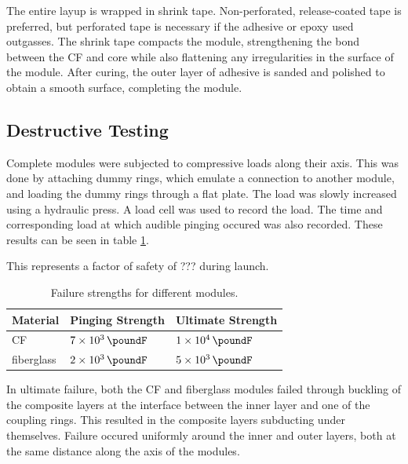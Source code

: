 \documentclass{aiaa-tc}%
\begin{document}
The entire layup is wrapped in shrink tape. Non-perforated, release-coated tape is preferred, but perforated tape is necessary if the adhesive or epoxy used outgasses.
The shrink tape compacts the module, strengthening the bond between the CF and core while also flattening any irregularities in the surface of the module. 
After curing, the outer layer of adhesive is sanded and polished to obtain a smooth surface, completing the module. 

\subsection{Destructive Testing}
Complete modules were subjected to compressive loads along their axis. This was done by attaching dummy rings, which emulate a connection to another module, and loading the dummy rings through a flat plate. 
The load was slowly increased using a hydraulic press. 
A load cell was used to record the load. The time and corresponding load at which audible pinging occured was also recorded.
These results can be seen in table \ref{tab:compression}.

This represents a factor of safety of ???
during launch.

\begin{table}
\caption{Failure strengths for different modules.}\label{tab:compression}
\begin{tabular}{lll}
	Material & Pinging Strength & Ultimate Strength\\
	\hline
	CF & $\SI{7e3}{\poundF}$ & $\SI{1e4}{\poundF}$ \\
	fiberglass & $\SI{2e3}{\poundF}$ & $\SI{5e3}{\poundF}$ \\
	
\end{tabular}
\end{table}

In ultimate failure, both the CF and fiberglass modules failed through buckling of the composite layers at the interface between the inner layer and one of the coupling rings.
This resulted in the composite layers subducting under themselves.
Failure occured uniformly around the inner and outer layers, both at the same distance along the axis of the modules. 
\end{document}
